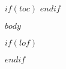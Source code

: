 \documentclass[12pt,a4paper]{report}
\begin{document}


$if(toc)$
\tableofcontents
$endif$



$body$

$if(lof)$
\listoffigures
$endif$


\end{document}
